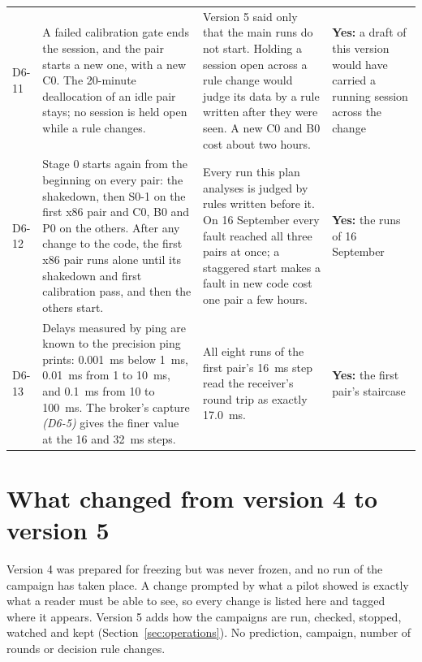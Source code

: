 \documentclass[11pt]{article}
\newcommand{\gl}[1]{{\color{soft}\itshape\small (#1)}}
\begin{document}
{\begin{longtable}{@{}p{1.0cm} >{\raggedright\arraybackslash}p{6.2cm} >{\raggedright\arraybackslash}p{6.0cm} >{\raggedright\arraybackslash}p{2.2cm}@{}}
D6-11 & A failed calibration gate ends the session, and the pair starts a new one, with a new C0. The 20-minute deallocation of an idle pair stays; no session is held open while a rule changes. & Version 5 said only that the main runs do not start. Holding a session open across a rule change would judge its data by a rule written after they were seen. A new C0 and B0 cost about two hours. & \textbf{Yes:} a draft of this version would have carried a running session across the change \\
D6-12 & Stage 0 starts again from the beginning on every pair: the shakedown, then S0-1 on the first x86 pair and C0, B0 and P0 on the others. After any change to the code, the first x86 pair runs alone until its shakedown and first calibration pass, and then the others start. & Every run this plan analyses is judged by rules written before it. On 16 September every fault reached all three pairs at once; a staggered start makes a fault in new code cost one pair a few hours. & \textbf{Yes:} the runs of 16 September \\
D6-13 & Delays measured by ping are known to the precision ping prints: 0.001~ms below 1~ms, 0.01~ms from 1 to 10~ms, and 0.1~ms from 10 to 100~ms. The broker's capture \gl{D6-5} gives the finer value at the 16 and 32~ms steps. & All eight runs of the first pair's 16~ms step read the receiver's round trip as exactly 17.0~ms. & \textbf{Yes:} the first pair's staircase \\
\bottomrule
\end{longtable}}

\section*{What changed from version 4 to version 5}
Version 4 was prepared for freezing but was never frozen, and no run of the campaign has taken place. A change prompted by what a pilot showed is exactly what a reader must be able to see, so every change is listed here and tagged where it appears. Version 5 adds how the campaigns are run, checked, stopped, watched and kept (Section~\ref{sec:operations}). No prediction, campaign, number of rounds or decision rule changes.
\end{document}
